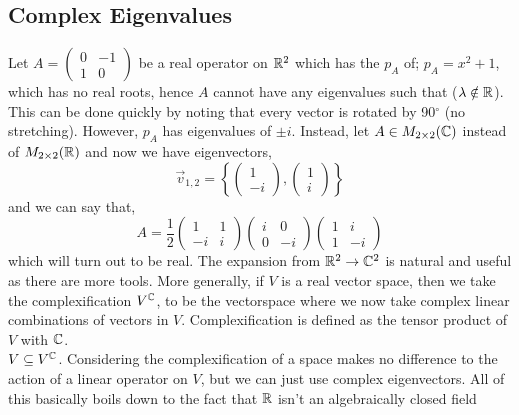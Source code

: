 \documentclass{article}
\begin{document}
\subsection{Complex Eigenvalues}
Let $\displaystyle{A = \begin{pmatrix}
  0 & -1 \\ 1 & 0
\end{pmatrix}}$  be a real operator on $\mathbb{R}^2$ which has the $p_A$ of; $p_A = x^2 + 1$, which has no real roots, hence $A$ cannot have any eigenvalues such that ($\lambda \notin \mathbb{R}$). This can be done quickly by noting that every vector is rotated by 90$^\circ$ (no stretching). However, $p_A$ has eigenvalues of $\pm i$. Instead, let $A \in M_{2\times 2}(\mathbb{C})$ instead of $ M_{2\times 2}(\mathbb{R})$ and now we have eigenvectors,
$$ \vec v_{1, 2} = \left \{ \begin{pmatrix}
  1 \\ -i
\end{pmatrix}, \begin{pmatrix}
  1 \\ i
\end{pmatrix} \right \} $$
and we can say that,
$$ A = \frac{1}{2} \begin{pmatrix}
  1 & 1 \\ -i & i
\end{pmatrix} \begin{pmatrix}
  i & 0 \\ 0 & -i
\end{pmatrix} \begin{pmatrix}
  1 & i \\ 1 & -i
\end{pmatrix} $$
which will turn out to be real. The expansion from $\mathbb{R}^2 \to \mathbb{C}^2$ is natural and useful as there are more tools. More generally, if $V$ is a real vector space, then we take the complexification $V^{\mathbb{C}}$, to be the vectorspace where we now take complex linear combinations of vectors in $V$.
{\color{red} Complexification is defined as the tensor product of $V$ with $\mathbb{C}$.}\\

$V \subseteq V^{\mathbb{C}}$. Considering the complexification of a space makes no difference to the action of a linear operator on $V$, but we can just use complex eigenvectors. {\color{red} All of this basically boils down to the fact that $\mathbb{R}$ isn't an algebraically closed field}
\end{document}
